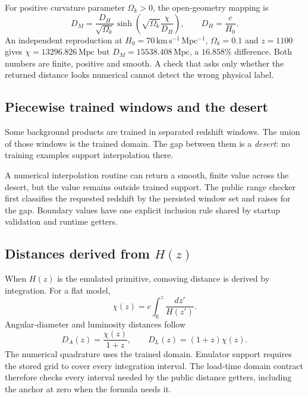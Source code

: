 \documentclass[10pt,aps,prd,twocolumn,nofootinbib]{revtex4-2}
\begin{document}
For positive curvature parameter \(\Omega_k>0\), the open-geometry mapping is
\begin{equation*}
 D_M=\frac{D_H}{\sqrt{\Omega_k}}
      \sinh\!\left(\sqrt{\Omega_k}\frac{\chi}{D_H}\right),
 \qquad D_H=\frac{c}{H_0}.
\end{equation*}
An independent reproduction at $H_0=70\,\mathrm{km\,s^{-1}\,Mpc^{-1}}$,
$\Omega_k=0.1$ and $z=1100$ gives
$\chi=13296.826\,\mathrm{Mpc}$ but
$D_M=15538.408\,\mathrm{Mpc}$, a $16.858\%$
difference.  Both numbers are finite, positive and smooth.  A check that asks
only whether the returned distance looks numerical cannot detect the wrong
physical label.

\subsection{Piecewise trained windows and the desert}

Some background products are trained in separated redshift windows.  The
union of those windows is the trained
domain.  The gap between them is a \emph{desert}: no training examples support
interpolation there.

A numerical interpolation routine can return a smooth, finite value across
the desert, but the value remains outside trained support.  The public range checker
first classifies the requested redshift by the persisted window set and raises
for the gap.  Boundary values have one explicit inclusion rule shared by
startup validation and runtime getters.

\subsection{Distances derived from \(H(z)\)}

When \(H(z)\) is the emulated primitive, comoving distance is derived by
integration.  For a flat model,
\begin{equation*}
 \chi(z)=c\int_0^z\frac{dz'}{H(z')}.
\end{equation*}
Angular-diameter and luminosity distances follow
\begin{equation*}
  D_A(z)=\frac{\chi(z)}{1+z},\qquad
  D_L(z)=(1+z)\chi(z).
\end{equation*}
The numerical quadrature uses the trained domain.  Emulator support requires
the stored grid to cover every integration interval.  The load-time domain contract
therefore checks every interval needed by the
public distance getters, including the anchor at zero when the formula needs
it.
\end{document}
